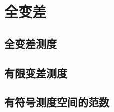 \section{全变差}
\label{b1:sec:0602}


\subsection{全变差测度}
\label{b1:subsec:060201}

\subsection{有限变差测度}
\label{b1:subsec:060202}

\subsection{有符号测度空间的范数}
\label{b1:subsec:060203}


